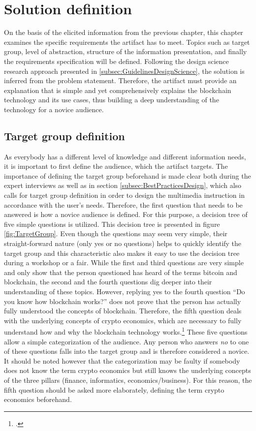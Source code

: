 \chapter{Solution definition} \label{chapter:Solution}

On the basis of the elicited information from the previous chapter, this chapter examines the specific requirements the artifact has to meet. Topics such as target group, level of abstraction, structure of the information presentation, and finally the requirements specification will be defined. Following the design science research approach presented in \ref{subsec:GuidelinesDesignScience}, the solution is inferred from the problem statement. Therefore, the artifact must provide an explanation that is simple and yet comprehensively explains the blockchain technology and its use cases, thus building a deep understanding of the technology for a novice audience.  

\section{Target group definition}
As everybody has a different level of knowledge and different information needs, it is important to first define the audience, which the artifact targets. The importance of defining the target group beforehand is made clear both during the expert interviews as well as in section \ref{subsec:BestPracticesDesign}, which also calls for target group definition in order to design the multimedia instruction in accordance with the user's needs. Therefore, the first question that needs to be answered is how a novice audience is defined. For this purpose, a decision tree of five simple questions is utilized. This decision tree is presented in figure \ref{fig:TargetGroup}. Even though the questions may seem very simple, their straight-forward nature (only yes or no questions) helps to quickly identify the target group and this characteristic also makes it easy to use the decision tree during a workshop or a fair. While the first and third questions are very simple and only show that the person questioned has heard of the terms bitcoin and blockchain, the second and the fourth questions dig deeper into their understanding of these topics. However, replying yes to the fourth question \enquote{Do you know how blockchain works?} does not prove that the person has actually fully understood the concepts of blockchain. Therefore, the fifth question deals with the underlying concepts of crypto economics, which are necessary to fully understand how and why the blockchain technology works.\footcite[Cf.][]{RalphBeckmann_Interview} These five questions allow a simple categorization of the audience. Any person who answers \textit{no} to one of these questions falls into the target group and is therefore considered a novice. It should be noted however that the categorization may be faulty if somebody does not know the term crypto economics but still knows the underlying concepts of the three pillars (finance, informatics, economics/business). For this reason, the fifth question should be asked more elaborately, defining the term crypto economics beforehand.

